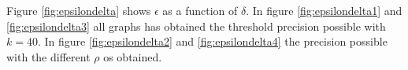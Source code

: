 Figure \ref{fig:epsilondelta} shows $\epsilon$ as a function of $\delta$. In figure \ref{fig:epsilondelta1} and \ref{fig:epsilondelta3} all graphs has obtained the threshold precision possible with $k=40$. In
figure \ref{fig:epsilondelta2} and \ref{fig:epsilondelta4} the precision possible with the different $\rho$ os obtained.


